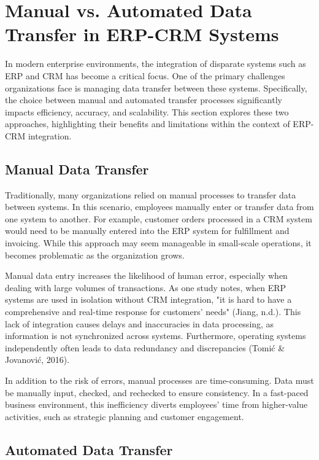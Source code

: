 \section{Manual vs. Automated Data Transfer in ERP-CRM Systems}

In modern enterprise environments, the integration of disparate systems such as ERP and CRM has become a critical focus. One of the primary challenges organizations face is managing data transfer between these systems. Specifically, the choice between manual and automated transfer processes significantly impacts efficiency, accuracy, and scalability. This section explores these two approaches, highlighting their benefits and limitations within the context of ERP-CRM integration.

\subsection{Manual Data Transfer}

Traditionally, many organizations relied on manual processes to transfer data between systems. In this scenario, employees manually enter or transfer data from one system to another. For example, customer orders processed in a CRM system would need to be manually entered into the ERP system for fulfillment and invoicing. While this approach may seem manageable in small-scale operations, it becomes problematic as the organization grows.

Manual data entry increases the likelihood of human error, especially when dealing with large volumes of transactions. As one study notes, when ERP systems are used in isolation without CRM integration, "it is hard to have a comprehensive and real-time response for customers' needs" (Jiang, n.d.). This lack of integration causes delays and inaccuracies in data processing, as information is not synchronized across systems. Furthermore, operating systems independently often leads to data redundancy and discrepancies (Tomić \& Jovanović, 2016).

In addition to the risk of errors, manual processes are time-consuming. Data must be manually input, checked, and rechecked to ensure consistency. In a fast-paced business environment, this inefficiency diverts employees' time from higher-value activities, such as strategic planning and customer engagement.

\subsection{Automated Data Transfer}

